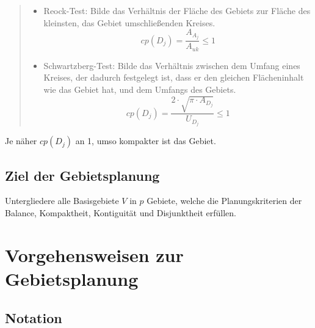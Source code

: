       \begin{quote}
        \begin{itemize}

          \item Reock-Test: Bilde das Verhältnis der Fläche des Gebiets zur Fläche des kleinsten, das Gebiet umschließenden Kreises.
          \begin{equation*}
            cp(D_j) = \frac{A_{A_j}}{A_{uk}} \leq 1
          \end{equation*}

          \item Schwartzberg-Test: Bilde das Verhältnis zwischen dem Umfang eines Kreises, der dadurch festgelegt ist, dass er den gleichen Flächeninhalt wie das Gebiet hat, und dem Umfangs des Gebiets.
          \begin{equation*}
            cp(D_j) = \frac{2 \cdot \sqrt{\pi \cdot A_{D_j}}}{U_{D_j}} \leq 1
          \end{equation*}

        \end{itemize}
      \end{quote}
        

        Je näher $cp(D_j)$ an 1, umso kompakter ist das Gebiet.


    \subsection{Ziel der Gebietsplanung} %
    \label{sub:ziel_der_gebietsplanung}

      \par Untergliedere alle Basisgebiete $V$ in $p$ Gebiete, welche die Planungskriterien der Balance, Kompaktheit, Kontiguität und Disjunktheit erfüllen.
    
    
    

  \section{Vorgehensweisen zur Gebietsplanung} %
  \label{sec:vorgehensweisen_zur_gebietsplanung}

    \subsection{Notation} %
    \label{sub:notation}

